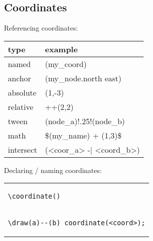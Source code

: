 \subsection*{Coordinates}
Referencing coordinates: \\
\begin{tabularx}{4cm}{l l}
    type & example \\
    \hline 
    named & (my\_coord) \\
    anchor & (my\_node.north east) \\
    absolute & (1,-3) \\
    relative & ++(2,2) \\
    tween & (node\_a)!.25!(node\_b) \\
    math & \$(my\_name) + (1,3)\$ \\
    intersect & (<coor\_a> -| <coord\_b>)
\end{tabularx}

Declaring / naming coordinates: \\
\begin{tabular}{l}
\begin{lstlisting}
\coordinate()
\end{lstlisting} \\
\begin{lstlisting}
\draw(a)--(b) coordinate(<coord>);
\end{lstlisting} \\
\end{tabular}


\ \\